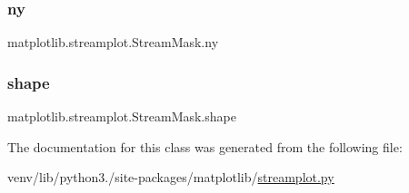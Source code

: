 \subsubsection{\texorpdfstring{ny}{ny}}
{\footnotesize\ttfamily matplotlib.\+streamplot.\+Stream\+Mask.\+ny}

\mbox{\label{classmatplotlib_1_1streamplot_1_1StreamMask_a47ecd4bba81385caca7a09a8cfc708b0}} 
\subsubsection{\texorpdfstring{shape}{shape}}
{\footnotesize\ttfamily matplotlib.\+streamplot.\+Stream\+Mask.\+shape}



The documentation for this class was generated from the following file\+:\begin{DoxyCompactItemize}
\item 
venv/lib/python3./site-\/packages/matplotlib/\hyperlink{streamplot_8py}{streamplot.\+py}\end{DoxyCompactItemize}
